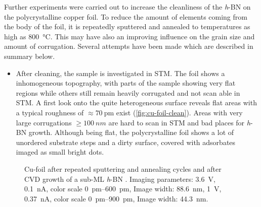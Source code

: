 Further experiments were carried out to increase the cleanliness of the \textit{h}-BN on the polycrystalline copper foil. To reduce the amount of elements coming from the body of the foil, it is repeatedly sputtered and annealed to temperatures as high as \SI{800}{\celsius}. This may have also an improving influence on the grain size and amount of corrugation. Several attempts have been made which are described in summary below.
\begin{itemize}
 \item After cleaning, the sample is investigated in STM. The foil shows a inhomogeneous topography, with parts of the sample showing very flat regions while others still remain heavily corrugated and not scan able in STM. 
 A first look onto the quite heterogeneous surface reveals flat areas with a typical roughness of $\approx \SI{70}{\pico\meter}$ exist (\autoref{fig:cu-foil-clean}). Areas with very large corrugations $\geq \SI{100}{nm}$ are hard to scan in STM and bad places for \textit{h}-BN growth. Although being flat, the polycrystalline foil shows a lot of unordered substrate steps and a dirty surface, covered with adsorbates imaged as small bright dots.
\end{itemize}
\begin{figure}[] \centering
	 \quad
	\caption{Cu-foil after repeated sputtering and annealing cycles  and after CVD growth of a sub-ML \textit{h}-BN . Imaging parameters:  \SI{3.6}{\volt}, \SI{0.1}{\nano\ampere}, color scale \SIrange{0}{600}{\pico\meter}, Image width: \SI{88,6}{\nano \meter}, 
	 \SI{1}{\volt}, \SI{0.37}{\nano\ampere}, color scale \SIrange{0}{900}{\pico\meter}, Image width: \SI{44,3}{\nano \meter}.
	}
\end{figure}
